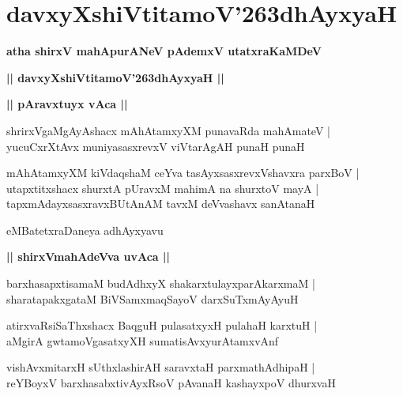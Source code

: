 \documentclass[twoside,12pt,openright]{book}
\def\S{\char'263}
\newcounter{shloka}[chapter]
\def\uvaca#1{\centerline{{\large\textbf{#1}}}}
\begin{document}
\chapter{davxyXshiVtitamoV\S dhAyxyaH}

\begin{center}
{\LARGE\bfseries atha shirxV mahApurANeV pAdemxV utatxraKaMDeV}
\end{center}

\begin{center}
{\LARGE\bfseries || davxyXshiVtitamoV\S dhAyxyaH || }
\end{center}

\uvaca{|| pAravxtuyx vAca ||}

\begin{shloka}%
shrirxVgaMgAyAshacx mAhAtamxyXM punavaRda mahAmateV |\\
yucuCxrXtAvx muniyasasxrevxV viVtarAgAH punaH punaH 
\end{shloka}

\begin{shloka}%
mAhAtamxyXM kiVdaqshaM ceYva tasAyxsasxrevxVshavxra parxBoV |\\
utapxtitxshacx shurxtA pUravxM mahimA na shurxtoV mayA |\\
tapxmAdayxsasxravxBUtAnAM tavxM deVvashavx sanAtanaH 
\end{shloka}

\begin{center}
eMBatetxraDaneya adhAyxyavu
\end{center}

\uvaca{|| shirxVmahAdeVva uvAca ||}

\begin{shloka}%
barxhasapxtisamaM budAdhxyX shakarxtulayxparAkarxmaM |\\
sharatapakxgataM BiVSamxmaqSayoV darxSuTxmAyAyuH 
\end{shloka}

\begin{shloka}%
atirxvaRsiSaThxshacx BaqguH pulasatxyxH pulahaH karxtuH |\\
aMgirA gwtamoVgasatxyXH sumatisAvxyurAtamxvAnf 
\end{shloka}

\begin{shloka}%
vishAvxmitarxH sUthxlashirAH saravxtaH parxmathAdhipaH |\\
reYBoyxV barxhasabxtivAyxRsoV pAvanaH kashayxpoV dhurxvaH 
\end{shloka}
\end{document}
